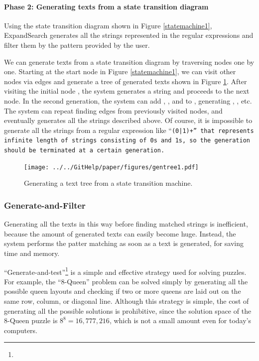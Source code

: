 \documentclass[manuscript,anonymous,review]{acmart}
\def\ES{\textsf{ExpandSearch}}
\begin{document}
\paragraph{Phase 2: Generating texts from a state transition diagram}

Using the state transition diagram shown in Figure \ref{statemachine1},
{\ES} generates all the strings represented in the regular expressions
and filter them by the pattern provided by the user.

We can generate texts from a state transition diagram by traversing nodes one by one.
Starting at the start node
in Figure \ref{statemachine1},
we can visit other nodes via edges and generate a tree of generated texts
shown in Figure \ref{gentree1}.
After visiting the initial node
,
the system generates a string  and proceeds to the next node.
In the second generation,
the system can add , , and 
to , generating
, , etc.
The system can repeat finding edges from previously visited nodes,
and eventually generates all the strings described above.
Of course, it is impossible to generate all the strings
from a regular expression like ``\tt{(0|1)+}'' that represents infinite length of
strings consisting of \tt{0}s and \tt{1}s, so the generation should be
terminated at a certain generation.

\begin{figure}[htb]
\texttt{[image: ../../GitHelp/paper/figures/gentree1.pdf]}
\caption{Generating a text tree from a state transition machine.}
\label{gentree1}
\end{figure}

\subsubsection{Generate-and-Filter}

Generating all the texts in this way before finding matched strings is
inefficient, because the amount of generated texts can easily become huge.
Instead, the system performs the patter matching as soon as a text is generated,
for saving time and memory.

``Generate-and-test''\footnote{
}
is a simple and effective strategy used for solving puzzles.
For example,
the ``8-Queen'' problem can be solved simply by
generating all the possible queen layouts and checking if
two or more queens are laid out on the same row, column, or diagonal line.
Although this strategy is simple, the cost of
generating all the possible solutions is prohibitive, since
the solution space of the 8-Queen puzzle is $8^8 = 16,777,216$,
which is not a small amount even for today's computers.
\end{document}
